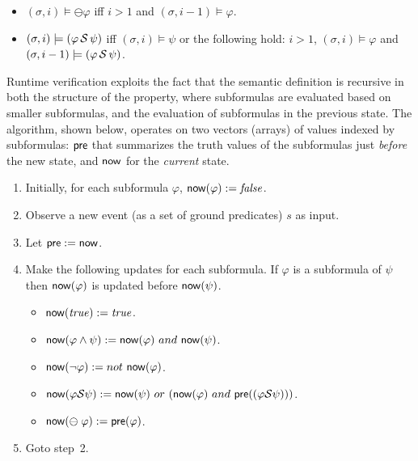 \begin{itemize}
\item $( \sigma , i) \models \ominus \varphi$ iff $i > 1$ and $(\sigma, i-1) \models \varphi$.
\item $(\sigma , i) \models (\varphi \, {\cal S} \, \psi)$ iff $(\sigma , i) \models \psi$ or the following hold: $i>1$,
$( \sigma , i)  \models \varphi$ and 
$(\sigma , i-1 ) \models ( \varphi \, {\cal S} \, \psi )$.
\end{itemize}

\noindent
Runtime verification exploits the fact that
the semantic definition is recursive in both the structure of the property, where subformulas
are evaluated based on smaller subformulas, and the
evaluation of subformulas in the previous state.
The algorithm, shown below, operates on two vectors (arrays) of values indexed by subformulas:  $\mathsf{pre}$ that summarizes the truth values of the
subformulas just {\em before} the new state, and $\mathsf{now}$ for the {\em current} state.

\begin{enumerate}
\item Initially, for each subformula $\varphi$,
$\mathsf{now} ( \varphi ) := \mathit{false}$.
\item Observe a new event (as a set of ground predicates) $s$ as input. 
\item Let $\mathsf{pre} := \mathsf{now}$.
\item Make the following updates for each subformula. If $\varphi$ is
      a subformula of $\psi$ then $\mathsf{now} ( \varphi )$ is updated before 
      $\mathsf{now} ( \psi )$.

\begin{itemize}
  \item $\mathsf{now} ( \mathit{true} ) := \mathit{true}$.
  \item $\mathsf{now} (  \varphi \wedge \psi  ) := 
  \mathsf{now} ( \varphi )\  and\ \mathsf{now} ( \psi )$.
  \item $\current ( \neg \varphi  ) := not\ \current ( \varphi )$.
  \item $\current (  \varphi \since \psi  ) :=  
  \current ( \psi  )\ or\ ( \current ( \varphi ) \ and\ 
      \old ( ( \varphi \since  \psi )))$.
  \item $\mathsf{now} ( \ominus \; \varphi ) := \mathsf{pre} ( \varphi )$.
  
\end{itemize}
\item Goto step~2.
\end{enumerate}

